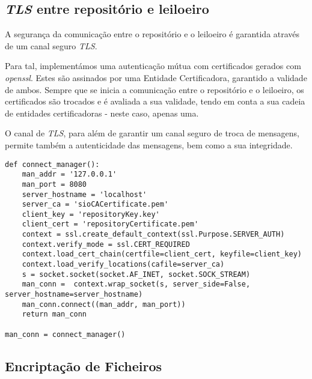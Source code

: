 \documentclass[12pt]{article}
\begin{document}
\subsection{\textit{TLS} entre repositório e leiloeiro}

\par A segurança da comunicação entre o repositório e o leiloeiro é garantida através de um canal seguro \textit{TLS}.

\par Para tal, implementámos uma autenticação mútua com certificados gerados com \textit{openssl}. Estes são assinados por uma Entidade Certificadora, garantido a validade de ambos. Sempre que se inicia a comunicação entre o repositório e o leiloeiro, os certificados são trocados e é avaliada a sua validade, tendo em conta a sua cadeia de entidades certificadoras - neste caso, apenas uma.

\par O canal de \textit{TLS}, para além de garantir um canal seguro de troca de mensagens, permite também a autenticidade das mensagens, bem como a sua integridade.

\vspace{5mm} %

\begin{lstlisting}[caption={Autenticação Mútua entre o Repositório e o Leiloeiro com Recurso a \textit{TLS}},captionpos=b]
def connect_manager():
    man_addr = '127.0.0.1'
    man_port = 8080
    server_hostname = 'localhost'
    server_ca = 'sioCACertificate.pem'
    client_key = 'repositoryKey.key'
    client_cert = 'repositoryCertificate.pem'
    context = ssl.create_default_context(ssl.Purpose.SERVER_AUTH)
    context.verify_mode = ssl.CERT_REQUIRED
    context.load_cert_chain(certfile=client_cert, keyfile=client_key)
    context.load_verify_locations(cafile=server_ca)
    s = socket.socket(socket.AF_INET, socket.SOCK_STREAM)
    man_conn =  context.wrap_socket(s, server_side=False, server_hostname=server_hostname)
    man_conn.connect((man_addr, man_port))
    return man_conn

man_conn = connect_manager()
\end{lstlisting}





\subsection{Encriptação de Ficheiros}
\end{document}
